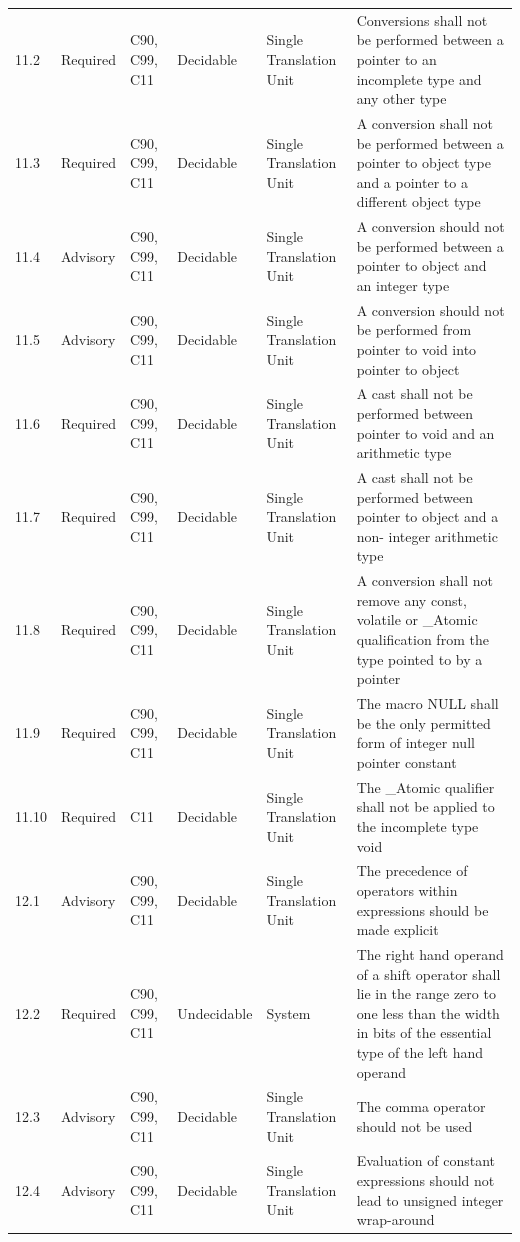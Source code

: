 \documentclass[11pt]{article}
\begin{document}
{\begin{longtable}{@{}p{1.0cm}p{1.6cm}p{1.8cm}p{2.0cm}p{1.6cm}p{7.4cm}@{}}
11.2 & Required & C90, C99, C11 & Decidable & Single Translation Unit & Conversions shall not be performed between a pointer to an incomplete type and any other type \\
11.3 & Required & C90, C99, C11 & Decidable & Single Translation Unit & A conversion shall not be performed between a pointer to object type and a pointer to a different object type \\
11.4 & Advisory & C90, C99, C11 & Decidable & Single Translation Unit & A conversion should not be performed between a pointer to object and an integer type \\
11.5 & Advisory & C90, C99, C11 & Decidable & Single Translation Unit & A conversion should not be performed from pointer to void into pointer to object \\
11.6 & Required & C90, C99, C11 & Decidable & Single Translation Unit & A cast shall not be performed between pointer to void and an arithmetic type \\
11.7 & Required & C90, C99, C11 & Decidable & Single Translation Unit & A cast shall not be performed between pointer to object and a non- integer arithmetic type \\
11.8 & Required & C90, C99, C11 & Decidable & Single Translation Unit & A conversion shall not remove any const, volatile or \_Atomic qualification from the type pointed to by a pointer \\
11.9 & Required & C90, C99, C11 & Decidable & Single Translation Unit & The macro NULL shall be the only permitted form of integer null pointer constant \\
11.10 & Required & C11 & Decidable & Single Translation Unit & The \_Atomic qualifier shall not be applied to the incomplete type void \\
12.1 & Advisory & C90, C99, C11 & Decidable & Single Translation Unit & The precedence of operators within expressions should be made explicit \\
12.2 & Required & C90, C99, C11 & Undecidable & System & The right hand operand of a shift operator shall lie in the range zero to one less than the width in bits of the essential type of the left hand operand \\
12.3 & Advisory & C90, C99, C11 & Decidable & Single Translation Unit & The comma operator should not be used \\
12.4 & Advisory & C90, C99, C11 & Decidable & Single Translation Unit & Evaluation of constant expressions should not lead to unsigned integer wrap-around \\

\end{longtable}}
\end{document}
